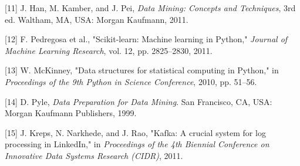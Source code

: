[11] J. Han, M. Kamber, and J. Pei, \textit{Data Mining: Concepts and Techniques}, 3rd ed. Waltham, MA, USA: Morgan Kaufmann, 2011.

[12] F. Pedregosa et al., "Scikit-learn: Machine learning in Python," \textit{Journal of Machine Learning Research}, vol. 12, pp. 2825--2830, 2011.

[13] W. McKinney, "Data structures for statistical computing in Python," in \textit{Proceedings of the 9th Python in Science Conference}, 2010, pp. 51--56.

[14] D. Pyle, \textit{Data Preparation for Data Mining}. San Francisco, CA, USA: Morgan Kaufmann Publishers, 1999.

[15] J. Kreps, N. Narkhede, and J. Rao, "Kafka: A crucial system for log processing in LinkedIn," in \textit{Proceedings of the 4th Biennial Conference on Innovative Data Systems Research (CIDR)}, 2011.